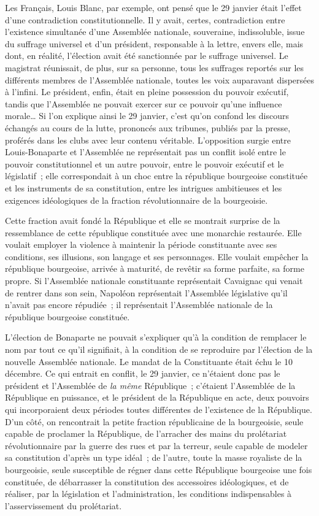 \documentclass[french,twoside]{book} %
\begin{document}
Les Français, Louis Blanc, par exemple, ont pensé que le 29 janvier était l’effet d’une contradiction constitutionnelle. Il y avait, certes, contradiction entre l’existence simultanée d’une Assemblée nationale, souveraine, indissoluble, issue du suffrage universel et d’un président, responsable à la lettre, envers elle, mais dont, en réalité, l’élection avait été sanctionnée par le suffrage universel. Le magistrat réunissait, de plus, sur sa personne, tous les suffrages reportés sur les différents membres de l’Assemblée nationale, toutes les voix auparavant dispersées à l’infini. Le président, enfin, était en pleine possession du pouvoir exécutif, tandis que l’Assemblée ne pouvait exercer sur ce pouvoir qu’une influence morale… Si l’on explique ainsi le 29 janvier, c’est qu’on confond les discours échangés au cours de la lutte, prononcés aux tribunes, publiés par la presse, proférés dans les clubs avec leur contenu véritable. L’opposition surgie entre Louis-Bonaparte et l’Assemblée ne représentait pas un conflit isolé entre le pouvoir constitutionnel et un autre pouvoir, entre le pouvoir exécutif et le législatif ; elle correspondait à un choc entre la république bourgeoise constituée et les instruments de sa constitution, entre les intrigues ambitieuses et les exigences idéologiques de la fraction révolutionnaire de la bourgeoisie.\par
Cette fraction avait fondé la République et elle se montrait surprise de la ressemblance de cette république constituée avec une monarchie restaurée. Elle voulait employer la violence à maintenir la période constituante avec ses conditions, ses illusions, son langage et ses personnages. Elle voulait empêcher la république bourgeoise, arrivée à maturité, de revêtir sa forme parfaite, sa forme propre. Si l’Assemblée nationale constituante représentait Cavaignac qui venait de rentrer dans son sein, Napoléon représentait l’Assemblée législative qu’il n’avait pas encore répudiée ; il représentait l’Assemblée nationale de la république bourgeoise constituée.\par
L’élection de Bonaparte ne pouvait s’expliquer qu’à la condition de remplacer le nom par tout ce qu’il signifiait, à la condition de se reproduire par l’élection de la nouvelle Assemblée nationale. Le mandat de la Constituante était échu le 10 décembre. Ce qui entrait en conflit, le 29 janvier, ce n’étaient donc pas le président et l’Assemblée de \emph{la même} République ; c’étaient l’Assemblée de la République en puissance, et le président de la République en acte, deux pouvoirs qui incorporaient deux périodes toutes différentes de l’existence de la République. D’un côté, on rencontrait la petite fraction républicaine de la bourgeoisie, seule capable de proclamer la République, de l’arracher des mains du prolétariat révolutionnaire par la guerre des rues et par la terreur, seule capable de modeler sa constitution d’après un type idéal ; de l’autre, toute la masse royaliste de la bourgeoisie, seule susceptible de régner dans cette République bourgeoise une fois constituée, de débarrasser la constitution des accessoires idéologiques, et de réaliser, par la législation et l’administration, les conditions indispensables à l’asservissement du prolétariat.\par
\end{document}
